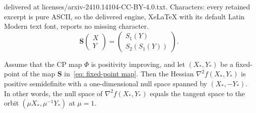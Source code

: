 \documentclass[10pt,a4paper]{amsart}
\newcommand{\bS}{\mathbf{S}}
\begin{document}
delivered at licenses/arxiv-2410.14104-CC-BY-4.0.txt. Characters: every retained excerpt is pure ASCII, so the delivered engine, XeLaTeX with its default Latin Modern text font, reports no missing character.
\begin{equation}\label{eq: fixed-point map}
\bS\!\begin{pmatrix} X \\ Y \end{pmatrix} = \begin{pmatrix} S_1(Y) \\ S_2(S_1(Y)) \end{pmatrix}.
\end{equation}

\begin{lemma}\label{lem: null space of Hessian}
Assume that the CP map $\Phi$ is positivity improving, and let $(X_*,Y_*)$ be a fixed-point of the map $\bS$ in~\eqref{eq: fixed-point map}. Then the Hessian $\nabla^2 f(X_*,Y_*)$ is positive semidefinite with a one-dimensional null space spanned by $(X_*,-Y_*)$. In other words, the null space of $\nabla^2 f(X_*,Y_*)$ equals the tangent space to the orbit $(\mu X_*,\mu^{-1} Y_*)$ at $\mu = 1$.
\end{lemma}
\end{document}
